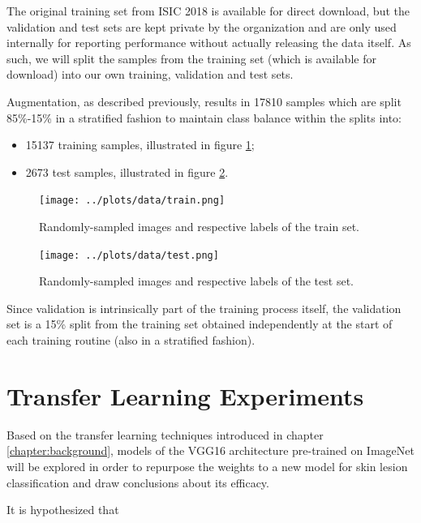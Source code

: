 The original training set from \ac{ISIC} 2018 is available for direct download, but the validation and test sets are kept private by the organization and are only used internally for reporting performance without actually releasing the data itself. As such, we will split the samples from the training set (which is available for download) into our own training, validation and test sets.

Augmentation, as described previously, results in 17810 samples which are split 85\%-15\% in a stratified fashion to maintain class balance within the splits into:

\begin{itemize}
    \item 15137 training samples, illustrated in figure \ref{fig:data_train};
    \item 2673 test samples, illustrated in figure \ref{fig:data_test}.
\end{itemize}

\begin{figure}[ht]
    \centering
    \texttt{[image: ../plots/data/train.png]}
    \caption{Randomly-sampled images and respective labels of the train set.}
    \label{fig:data_train}
\end{figure}

\begin{figure}[ht]
    \centering
    \texttt{[image: ../plots/data/test.png]}
    \caption{Randomly-sampled images and respective labels of the test set.}
    \label{fig:data_test}
\end{figure}

Since validation is intrinsically part of the training process itself, the validation set is a 15\% split from the training set obtained independently at the start of each training routine (also in a stratified fashion).

\section{Transfer Learning Experiments}

Based on the transfer learning techniques introduced in chapter \ref{chapter:background}, models of the VGG16 architecture pre-trained on ImageNet will be explored in order to repurpose the weights to a new model for skin lesion classification and draw conclusions about its efficacy.

It is hypothesized that


